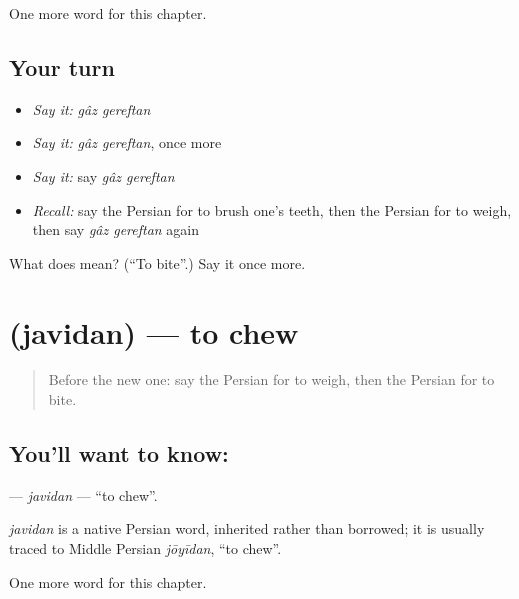 \begin{grammarlens}[title={What you've built}]
One more word for this chapter.
\end{grammarlens}

\subsection*{Your turn}
\begin{itemize}
\raggedright
  \item \emph{Say it:} \emph{gâz gereftan}
  \item \emph{Say it:} \emph{gâz gereftan}, once more
  \item \emph{Say it:} say \emph{gâz gereftan}
  \item \emph{Recall:} say the Persian for to brush one's teeth, then the Persian for to weigh, then say \emph{gâz gereftan} again
\end{itemize}

\begin{tcolorbox}[breakable,colback=teal!4,colframe=teal!35!black,title={Before you move on}]
What does   mean? (\textquotedblleft{}To bite\textquotedblright{}.) Say it once more.
\end{tcolorbox}
\section[\texorpdfstring{\fa{جویدن} (javidan)}{جویدن (javidan)}]{ (javidan) — to chew}

\label{lesson:FA-C255-javidan}



\begin{quote}
Before the new one: say the Persian for to weigh, then the Persian for to bite.
\end{quote}

\subsection*{You'll want to know: }
\textbf{} — \emph{javidan} — \textquotedblleft{}to chew\textquotedblright{}.

\begin{cousinweb}
\emph{javidan} is a native Persian word, inherited rather than borrowed; it is usually traced to Middle Persian \emph{jōyīdan}, \textquotedblleft{}to chew\textquotedblright{}.
\end{cousinweb}

\begin{grammarlens}[title={What you've built}]
One more word for this chapter.
\end{grammarlens}

